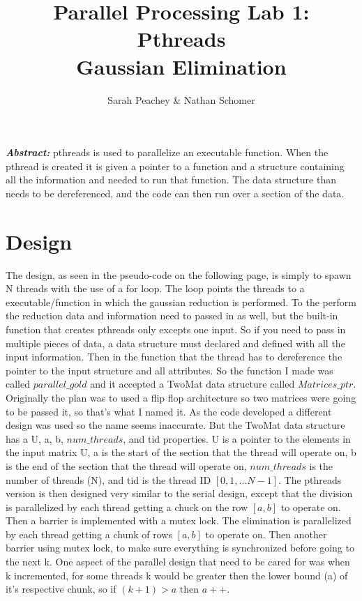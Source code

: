 \documentclass[12pt]{article}
\begin{document}
\title{Parallel Processing Lab 1: Pthreads \\ Gaussian Elimination}
\author{Sarah Peachey \& Nathan Schomer}
\maketitle

\textbf{\textit{Abstract:}} pthreads is used to parallelize an executable function. 
When the pthread is created it is given a pointer to a function and a structure containing 
all the information and needed to run that function. The data structure than needs to be 
dereferenced, and the code can then run over a section of the data. 

\newpage

\vspace{-1.5cm}
\section{Design}
\vspace{-0.25cm}
\qquad The design, as seen in the pseudo-code on the following page, is
simply to spawn N threads with the use of a for loop. The loop points the
threads to a executable/function in which the gaussian reduction is
performed. To the perform the reduction data and information need to passed
in as well, but the built-in function that creates pthreads only excepts one
input. So if you need to pass in multiple pieces of data, a data structure
must declared and defined with all the input information. Then in the
function that the thread has to dereference the pointer to the input
structure and all attributes. So the function I made was called
$parallel\_gold$ and it accepted a TwoMat data structure called
$Matrices\_ptr$.
Originally the plan was to used a flip flop architecture so two matrices
were going to be passed it, so that's what I named it. As the code developed
a different design was used so the name seems inaccurate. But the TwoMat
data structure has a U, a, b, $num\_threads$, and tid properties. U is a
pointer to the elements in the input matrix U, a is the start of the section
that the thread will operate on, b is the end of the section that the thread
will operate on, $num\_threads$ is the number of threads (N), and tid is the thread
ID $[0, 1, ... N-1]$. The pthreads version is then designed very similar to
the serial design, except that the division is parallelized by each thread
getting a chuck on the row $[a, b]$ to operate on. Then a barrier is
implemented with a mutex lock. The elimination is parallelized by each
thread getting a chunk of rows $[a, b]$ to operate on. Then another barrier
using mutex lock, to make sure everything is synchronized before going to the
next k. One aspect of the parallel design that need to be cared for was when
k incremented, for some threads k would be greater then the lower bound (a)
of it's respective chunk, so if $(k+1)>a$ then $a++$. 
   	
\end{document}
